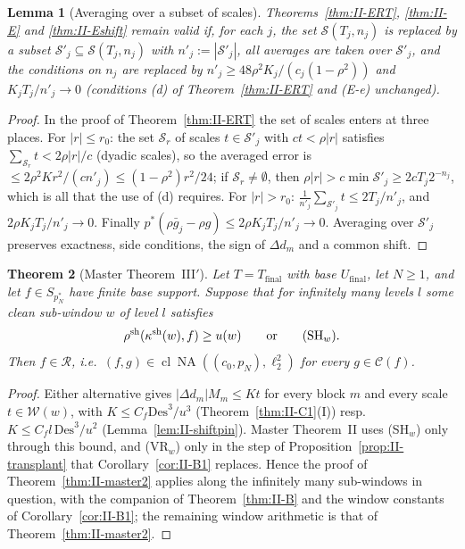 \documentclass[10pt]{amsart}
\newtheorem{theorem}{Theorem}[section]
\newtheorem{lemma}[theorem]{Lemma}
\theoremstyle{definition}
\theoremstyle{remark}
\newcommand{\NA}{\operatorname{NA}}
\newcommand{\Cset}{\mathcal C}
\newcommand{\cl}{\operatorname{cl}}
\newcommand{\Rec}{\mathcal R}
\begin{document}
\begin{lemma}[Averaging over a subset of scales]\label{lem:II-subset}
Theorems~\textup{\ref{thm:II-ERT}}, \textup{\ref{thm:II-E}} and
\textup{\ref{thm:II-Eshift}} remain valid if, for each $j$, the set
$\mathcal S(T_j,n_j)$ is replaced by a subset $\mathcal S'_j\subseteq\mathcal
S(T_j,n_j)$ with $n'_j:=|\mathcal S'_j|$, all averages are taken over
$\mathcal S'_j$, and the conditions on $n_j$ are replaced by
$n'_j\ge48\rho^2K_j/(c_j(1-\rho^2))$ and $K_jT_j/n'_j\to0$
\textup{(}conditions \textup{(d)} of Theorem~\textup{\ref{thm:II-ERT}} and
\textup{(E-e)} unchanged\textup{)}.
\end{lemma}

\begin{proof}
In the proof of Theorem~\ref{thm:II-ERT} the set of scales enters at three
places.  For $|r|\le r_0$: the set $\mathcal S_r$ of scales $t\in\mathcal
S'_j$ with $ct<\rho|r|$ satisfies $\sum_{\mathcal S_r}t<2\rho|r|/c$ (dyadic
scales), so the averaged error is $\le2\rho^2Kr^2/(cn'_j)\le(1-\rho^2)r^2/24$;
if $\mathcal S_r\ne\emptyset$, then $\rho|r|>c\min\mathcal S'_j\ge2cT_j2^{-n_j}$,
which is all that the use of (d) requires.  For $|r|>r_0$: $\frac1{n'_j}
\sum_{\mathcal S'_j}t\le2T_j/n'_j$, and $2\rho K_jT_j/n'_j\to0$.  Finally
$p^*(\rho\bar g_j-\rho g)\le2\rho K_jT_j/n'_j\to0$.  Averaging over $\mathcal
S'_j$ preserves exactness, side conditions, the sign of $\Delta d_m$ and a
common shift.
\end{proof}

\begin{theorem}[Master Theorem~III$'$]\label{thm:II-MTIII}
Let $T=T_{\mathrm{final}}$ with base $U_{\mathrm{final}}$, let $N\ge1$, and let $f\in S_{p_N^*}$ have finite base support.  Suppose that
for infinitely many levels $l$ some clean sub-window $w$ of level $l$
satisfies
\[
 \rho^{\rm sh}(\kappa^{\rm sh}(w),f)\ge u(w)\qquad\text{or}\qquad
 \text{\textup{(SH$_w$)}}.
\]
Then $f\in\Rec$, i.e.\ $(f,g)\in\cl\NA((c_0,p_N),\ell_2^2)$ for every
$g\in\Cset(f)$.
\end{theorem}

\begin{proof}
Either alternative gives $|\Delta d_m|M_m\le Kt$ for every block $m$ and every
scale $t\in\mathcal W(w)$, with $K\le C_f\mathrm{Des}^3/u^3$
(Theorem~\ref{thm:II-C1}(I)) resp.\ $K\le C_fl\,\mathrm{Des}^3/u^2$
(Lemma~\ref{lem:II-shiftpin}).  Master Theorem~II uses (SH$_w$) only through this
bound, and (VR$_w$) only in the step of Proposition~\ref{prop:II-transplant} that
Corollary~\ref{cor:II-B1} replaces.  Hence the proof of
Theorem~\ref{thm:II-master2} applies along the infinitely many sub-windows in
question, with the companion of Theorem~\ref{thm:II-B} and the window
constants of Corollary~\ref{cor:II-B1}; the remaining window arithmetic is
that of Theorem~\ref{thm:II-master2}.
\end{proof}
\end{document}

